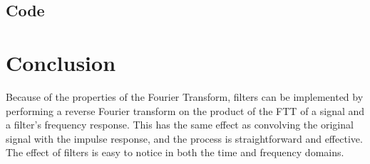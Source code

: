 \documentclass[11pt]{article}
\begin{document}
\subsection{Code}



\section{Conclusion}

Because of the properties of the Fourier Transform, filters can be
implemented by performing a reverse Fourier transform on the product
of the FTT of a signal and a filter's frequency response.
This has the same effect as convolving the original signal with the
impulse response, and the process is straightforward and effective.\\

The effect of filters is easy to notice in both the time and frequency domains.
\end{document}
